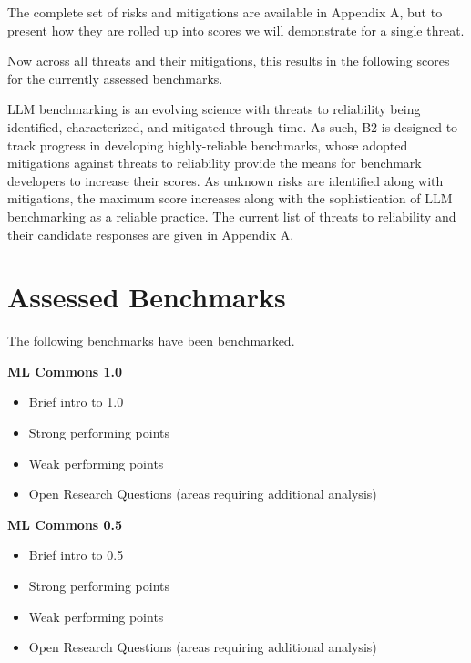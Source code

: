 \documentclass{article}
\begin{document}

The complete set of risks and mitigations are available in Appendix A, but to present how they are rolled up into scores we will demonstrate for a single threat.



Now across all threats and their mitigations, this results in the following scores for the currently assessed benchmarks.


LLM benchmarking is an evolving science with threats to reliability being identified, characterized, and mitigated through time. As such, B2 is designed to track progress in developing highly-reliable benchmarks, whose adopted mitigations against threats to reliability provide the means for benchmark developers to increase their scores. As unknown risks are identified along with mitigations, the maximum score increases along with the sophistication of LLM benchmarking as a reliable practice. The current list of threats to reliability and their candidate responses are given in Appendix A.

\section{Assessed Benchmarks}
The following benchmarks have been benchmarked.

{\bf ML Commons 1.0}
\begin{itemize}
\item Brief intro to 1.0
\item Strong performing points
\item Weak performing points
\item Open Research Questions (areas requiring additional analysis)
\end{itemize}
{\bf ML Commons 0.5}
\begin{itemize}
\item Brief intro to 0.5
\item Strong performing points
\item Weak performing points
\item Open Research Questions (areas requiring additional analysis)
\end{itemize}

\end{document}
